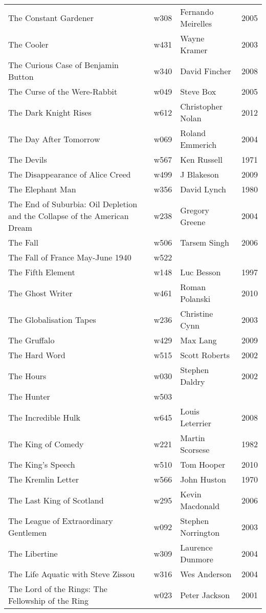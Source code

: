\documentclass{article}
\begin{document}
\begin {center}
\begin{longtable}{p{10cm} l l l}
The Constant Gardener & w308 & Fernando Meirelles & 2005 \\
The Cooler & w431 & Wayne Kramer & 2003 \\
The Curious Case of Benjamin Button & w340 & David Fincher & 2008 \\
The Curse of the Were-Rabbit & w049 & Steve Box & 2005 \\
The Dark Knight Rises & w612 & Christopher Nolan & 2012 \\
The Day After Tomorrow & w069 & Roland Emmerich & 2004 \\
The Devils & w567 & Ken Russell & 1971 \\
The Disappearance of Alice Creed & w499 & J Blakeson & 2009 \\
The Elephant Man & w356 & David Lynch & 1980 \\
The End of Suburbia: Oil Depletion and the Collapse of the American Dream & w238 & Gregory Greene & 2004 \\
The Fall & w506 & Tarsem Singh & 2006 \\
The Fall of France May-June 1940 & w522 &  &  \\
The Fifth Element & w148 & Luc Besson & 1997 \\
The Ghost Writer & w461 & Roman Polanski & 2010 \\
The Globalisation Tapes & w236 & Christine Cynn & 2003 \\
The Gruffalo & w429 & Max Lang & 2009 \\
The Hard Word & w515 & Scott Roberts & 2002 \\
The Hours & w030 & Stephen Daldry & 2002 \\
The Hunter & w503 &  &  \\
The Incredible Hulk & w645 & Louis Leterrier & 2008 \\
The King of Comedy & w221 & Martin Scorsese & 1982 \\
The King's Speech & w510 & Tom Hooper & 2010 \\
The Kremlin Letter & w566 & John Huston & 1970 \\
The Last King of Scotland & w295 & Kevin Macdonald & 2006 \\
The League of Extraordinary Gentlemen & w092 & Stephen Norrington & 2003 \\
The Libertine & w309 & Laurence Dunmore & 2004 \\
The Life Aquatic with Steve Zissou & w316 & Wes Anderson & 2004 \\
The Lord of the Rings: The Fellowship of the Ring & w023 & Peter Jackson & 2001 \\

\end{longtable}
\end{center}
\end{document}
